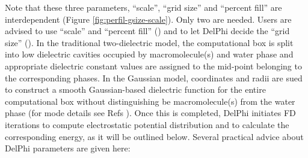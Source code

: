 \documentclass[9pt,tutorial]{livecoms}
\newcommand*\ttvar[1]{\texttt{\expandafter\dottvar\detokenize{#1}\relax}}
\newcommand*\dottvar[1]{\ifx\relax#1\else
  \expandafter\ifx\string_#1\string_\allowbreak\else#1\fi
  \expandafter\dottvar\fi}
\begin{document}
Note that these three parameters, “scale”, “grid size” and “percent fill” are interdependent (Figure \ref{fig:perfil-gsize-scale}). Only two are needed. Users are advised to use “scale” and “percent fill” (\ttvar{perfil}) and to let DelPhi decide the “grid size” (\ttvar{gsize}). In the traditional two-dielectric model, the computational box is split into low dielectric cavities occupied by macromolecule(s) and water phase and appropriate dielectric constant values are assigned to the mid-point belonging to the corresponding phases. In the Gaussian model, coordinates and radii are sued to construct a smooth Gaussian-based dielectric function for the entire computational box without distinguishing be macromolecule(s) from the water phase (for mode details see Refs \cite{li2014modeling,li2013dielectric}). Once this is completed, DelPhi initiates FD iterations to compute electrostatic potential distribution and to calculate the corresponding energy, as it will be outlined below. Several practical advice about DelPhi parameters are given here:
\end{document}
